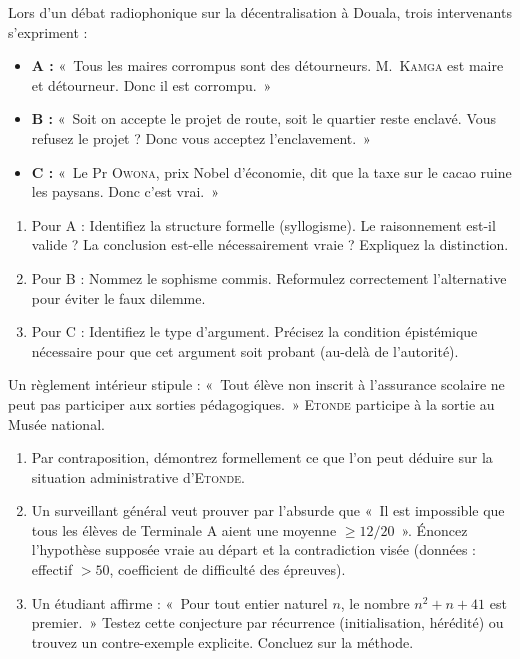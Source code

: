 \documentclass[11pt]{article}
\begin{document}
\begin{exercice}
Lors d'un débat radiophonique sur la décentralisation à Douala, trois intervenants s'expriment :
\begin{itemize}
    \item \textbf{A :} «~Tous les maires corrompus sont des détourneurs. \textsc{M.~Kamga} est maire et détourneur. Donc il est corrompu.~»
    \item \textbf{B :} «~Soit on accepte le projet de route, soit le quartier reste enclavé. Vous refusez le projet ? Donc vous acceptez l'enclavement.~»
    \item \textbf{C :} «~Le Pr \textsc{Owona}, prix Nobel d'économie, dit que la taxe sur le cacao ruine les paysans. Donc c'est vrai.~»
\end{itemize}
\begin{enumerate}
    \item Pour A : Identifiez la structure formelle (syllogisme). Le raisonnement est-il valide ? La conclusion est-elle nécessairement vraie ? Expliquez la distinction.
    \item Pour B : Nommez le sophisme commis. Reformulez correctement l'alternative pour éviter le faux dilemme.
    \item Pour C : Identifiez le type d'argument. Précisez la condition épistémique nécessaire pour que cet argument soit probant (au-delà de l'autorité).
\end{enumerate}
\end{exercice}

\begin{exercice}
Un règlement intérieur stipule : «~Tout élève non inscrit à l'assurance scolaire ne peut pas participer aux sorties pédagogiques.~» \textsc{Etonde} participe à la sortie au Musée national.
\begin{enumerate}
    \item Par contraposition, démontrez formellement ce que l'on peut déduire sur la situation administrative d'\textsc{Etonde}.
    \item Un surveillant général veut prouver par l'absurde que «~Il est impossible que tous les élèves de Terminale A aient une moyenne $\ge 12/20$~». Énoncez l'hypothèse supposée vraie au départ et la contradiction visée (données : effectif $> 50$, coefficient de difficulté des épreuves).
    \item Un étudiant affirme : «~Pour tout entier naturel $n$, le nombre $n^2+n+41$ est premier.~» Testez cette conjecture par récurrence (initialisation, hérédité) ou trouvez un contre-exemple explicite. Concluez sur la méthode.
\end{enumerate}
\end{exercice}
\end{document}
